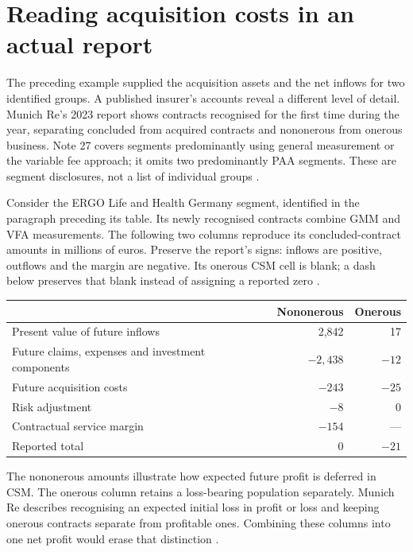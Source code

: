 \section{Reading acquisition costs in an actual report}
\label{sec:munich-new-contracts}

The preceding example supplied the acquisition assets and the net inflows
for two identified groups. A published insurer's accounts reveal a different
level of detail. Munich Re's 2023 report shows contracts recognised for the
first time during the year, separating concluded from acquired contracts and
nononerous from onerous business. Note 27 covers segments predominantly using
general measurement or the variable fee approach; it omits two predominantly
PAA segments. These are segment disclosures, not a list of individual groups
\citep[printed pp. 252--254]{munichre2023annual}.

Consider the ERGO Life and Health Germany segment, identified in the paragraph
preceding its table. Its newly recognised contracts combine GMM and VFA
measurements. The following two columns reproduce its concluded-contract
amounts in millions of euros. Preserve the report's signs: inflows are positive,
outflows and the margin are negative. Its onerous CSM cell is blank; a dash
below preserves that blank instead of assigning a reported zero
\citep[printed pp. 252--253]{munichre2023annual}.

\begin{center}
\begin{tabular}{p{}rr}
\toprule
 & Nononerous & Onerous \\
\midrule
Present value of future inflows & 2,842 & 17 \\
Future claims, expenses and investment components & $-2,438$ & $-12$ \\
Future acquisition costs & $-243$ & $-25$ \\
Risk adjustment & $-8$ & 0 \\
Contractual service margin & $-154$ & --- \\
Reported total & 0 & $-21$ \\
\bottomrule
\end{tabular}
\end{center}

The nononerous amounts illustrate how expected future profit is deferred in
CSM. The onerous column retains a loss-bearing population separately. Munich
Re describes recognising an expected initial loss in profit or loss and
keeping onerous contracts separate from profitable ones. Combining these
columns into one net profit would erase that distinction
\citep[printed pp. 165--166]{munichre2023annual}.

